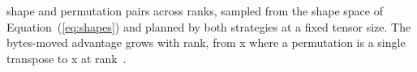 %
%
\begin{table}[!t]
\centering
\caption{ \planTabCases{} shape and permutation pairs across \planTabRanks{}
ranks, sampled from the shape space of Equation~(\ref{eq:shapes}) and planned
by both strategies at a fixed tensor size. The bytes-moved advantage grows
with rank, from \planTabWorstX{}x where a permutation is a single transpose to
\planTabBestX{}x at rank~\planTabBestRank{}.}
\label{tab:planners}
%
\end{table}
